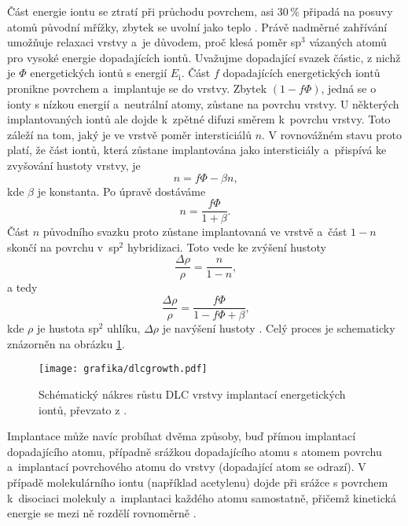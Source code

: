 Část energie iontu se ztratí při průchodu povrchem, asi 30\,\% připadá na posuvy atomů původní mřížky, zbytek se uvolní jako teplo \cite{Hofsass1998}. Právě nadměrné zahřívání umožňuje relaxaci vrstvy a~je důvodem, proč klesá poměr sp$^3$ vázaných atomů pro vysoké energie dopadajících iontů. Uvažujme dopadající svazek částic, z nichž je $\Phi$ energetických iontů s energií $E_\mathrm{i}$. Část $f$ dopadajících energetických iontů pronikne povrchem a~implantuje se do vrstvy. Zbytek $(1-f \Phi)$, jedná se o ionty s nízkou energií a~neutrální atomy, zůstane na povrchu vrstvy. U některých implantovaných iontů ale dojde k~zpětné difuzi směrem k~povrchu vrstvy. Toto záleží na tom, jaký je ve vrstvě poměr intersticiálů $n$. V rovnovážném stavu proto platí, že část iontů, která zůstane implantována jako intersticiály a~přispívá ke zvyšování hustoty vrstvy, je 
\begin{equation}
n = f \Phi - \beta n \text{,}
\end{equation}
kde $\beta$ je konstanta. Po úpravě dostáváme
\begin{equation}
n = \frac{f \Phi}{1 + \beta} \text{.}
\end{equation} 
Část $n$ původního svazku proto zůstane implantovaná ve vrstvě a~část $1-n$ skončí na povrchu v~sp$^2$ hybridizaci. Toto vede ke zvýšení hustoty
\begin{equation}
\frac{\Delta \rho}{\rho} = \frac{n}{1-n} \text{,}
\end{equation}  
a tedy
\begin{equation}
\frac{\Delta \rho}{\rho} = \frac{f \Phi}{1 - f \Phi + \beta} \text{,}
\end{equation}
kde $\rho$ je hustota sp$^2$ uhlíku, $\Delta \rho$ je navýšení hustoty \cite{Robertson1994}. Celý proces je schematicky znázorněn na obrázku \ref{dlcgrowth}.

\begin{figure}[tbp]
  \centering
  \texttt{[image: grafika/dlcgrowth.pdf]}
  \caption{Schématický nákres růstu DLC vrstvy implantací energetických iontů, převzato z \cite{Robertson2002}.}
  \label{dlcgrowth}
\end{figure}

Implantace může navíc probíhat dvěma způsoby, buď přímou implantací dopadajícího atomu, případně srážkou dopadajícího atomu s atomem povrchu a~implantací povrchového atomu do vrstvy (dopadající atom se odrazí). V případě molekulárního iontu (například acetylenu) dojde při srážce s povrchem k~disociaci molekuly a~implantaci každého atomu samostatně, přičemž kinetická energie se mezi ně rozdělí rovnoměrně \cite{Robertson2002}.

